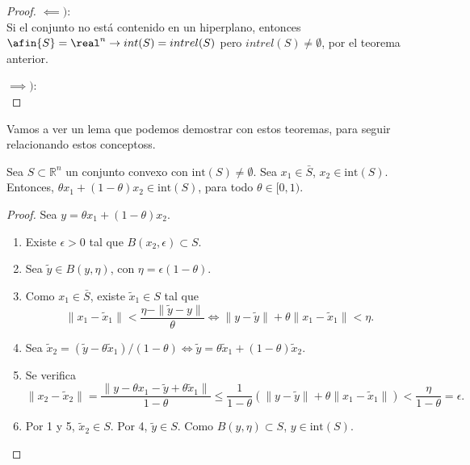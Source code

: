 \begin{proof}
$\impliedby)$:\\ Si el conjunto no está contenido en un hiperplano, entonces $\afin{S} = \real^n \to int(S) = intrel(S)$ pero $ intrel(S) ≠ \emptyset$, por el teorema anterior.

$\implies)$:\\

\end{proof}


Vamos a ver un lema que podemos demostrar con estos teoremas, para seguir relacionando estos conceptoss.


\begin{lemma}
Sea $S\subset\mathbb{R}^n$ un conjunto convexo con $\mbox{int}(S)\neq\emptyset$. Sea $x_1\in \bar{S}$, $x_2\in\mbox{int}(S)$. Entonces, $\theta x_1+ (1-\theta) x_2 \in\mbox{int}(S)$, para todo $\theta\in [0,1)$.
\end{lemma}

\begin{proof}

Sea $y=\theta x_1+ (1-\theta)x_2$.

\begin{enumerate}
\item Existe $\epsilon>0$ tal que $B(x_2,\epsilon)\subset S$.
\item Sea $\tilde{y}\in B(y,\eta)$, con $\eta=\epsilon(1-\theta)$.
\item Como $x_1\in\bar{S}$, existe $\tilde{x}_1\in S$ tal que 
\[
\|x_1-\tilde{x}_1\| < \frac{\eta-\|\tilde{y}-y\|}{\theta}
\Leftrightarrow \|y-\tilde{y}\| + \theta \|x_1 - \tilde{x}_1\| < \eta.
\]
\item Sea $\tilde{x}_2=(\tilde{y} - \theta \tilde{x}_1)/(1-\theta) \Leftrightarrow 
\tilde{y}=\theta \tilde{x}_1 + (1-\theta) \tilde{x}_2$.
\item Se verifica
\[
\|x_2-\tilde{x}_2\| = \frac{\|y-\theta x_1 - \tilde{y}+\theta\tilde{x}_1\|}{1-\theta}\leq  
\frac{1}{1-\theta}(\|y-\tilde{y}\| + \theta \|x_1 - \tilde{x}_1\|)<\frac{\eta}{1-\theta} = \epsilon.
\]
\item Por 1 y 5, $\tilde{x}_2\in S$. Por 4, $\tilde{y}\in S$. Como $B(y,\eta)\subset S$, $y\in \mbox{int}(S)$.


\end{enumerate}
\end{proof}

\begin{figure}[h]
\centering
{}
\end{figure}


